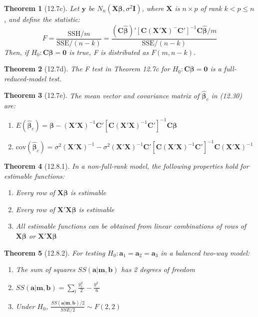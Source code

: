 \documentclass{article}
\newtheorem{theorem}{Theorem}[section]
\begin{document}
\begin{theorem}[12.7c]
Let $\mathbf{y}$ be $N_n(\mathbf{X}\boldsymbol{\beta}, \sigma^2\mathbf{I})$, where $\mathbf{X}$ is $n \times p$ of rank $k < p \leq n$, and define the statistic:
\[F = \frac{\text{SSH}/m}{\text{SSE}/(n-k)} = \frac{(\mathbf{C}\hat{\boldsymbol{\beta}})'[\mathbf{C}(\mathbf{X}'\mathbf{X})^{-}\mathbf{C}']^{-1}\mathbf{C}\hat{\boldsymbol{\beta}}/m}{\text{SSE}/(n-k)}\]
Then, if $H_0: \mathbf{C}\boldsymbol{\beta} = \mathbf{0}$ is true, F is distributed as $F(m, n-k)$.
\end{theorem}

\begin{theorem}[12.7d]
The F test in Theorem 12.7c for $H_0: \mathbf{C}\boldsymbol{\beta} = \mathbf{0}$ is a full-reduced-model test.
\end{theorem}

\begin{theorem}[12.7e]
The mean vector and covariance matrix of $\hat{\boldsymbol{\beta}}_c$ in (12.30) are:
\begin{enumerate}[label=(\roman*)]
\item $E(\hat{\boldsymbol{\beta}}_c) = \boldsymbol{\beta} - (\mathbf{X}'\mathbf{X})^{-1}\mathbf{C}'[\mathbf{C}(\mathbf{X}'\mathbf{X})^{-1}\mathbf{C}']^{-1}\mathbf{C}\boldsymbol{\beta}$
\item $\text{cov}(\hat{\boldsymbol{\beta}}_c) = \sigma^2(\mathbf{X}'\mathbf{X})^{-1} - \sigma^2(\mathbf{X}'\mathbf{X})^{-1}\mathbf{C}'[\mathbf{C}(\mathbf{X}'\mathbf{X})^{-1}\mathbf{C}']^{-1}\mathbf{C}(\mathbf{X}'\mathbf{X})^{-1}$
\end{enumerate}
\end{theorem}

\begin{theorem}[12.8.1]
In a non-full-rank model, the following properties hold for estimable functions:
\begin{enumerate}[label=(\roman*)]
\item Every row of $\mathbf{X}\boldsymbol{\beta}$ is estimable
\item Every row of $\mathbf{X}'\mathbf{X}\boldsymbol{\beta}$ is estimable
\item All estimable functions can be obtained from linear combinations of rows of $\mathbf{X}\boldsymbol{\beta}$ or $\mathbf{X}'\mathbf{X}\boldsymbol{\beta}$
\end{enumerate}
\end{theorem}

\begin{theorem}[12.8.2]
For testing $H_0: \mathbf{a}_1 = \mathbf{a}_2 = \mathbf{a}_3$ in a balanced two-way model:
\begin{enumerate}[label=(\roman*)]
\item The sum of squares $SS(\mathbf{a}|\mathbf{m},\mathbf{b})$ has 2 degrees of freedom
\item $SS(\mathbf{a}|\mathbf{m},\mathbf{b}) = \sum_i \frac{y_{i\cdot}^2}{2} - \frac{y_{\cdot\cdot}^2}{6}$
\item Under $H_0$, $\frac{SS(\mathbf{a}|\mathbf{m},\mathbf{b})/2}{SSE/2} \sim F(2,2)$
\end{enumerate}
\end{theorem}
\end{document}
